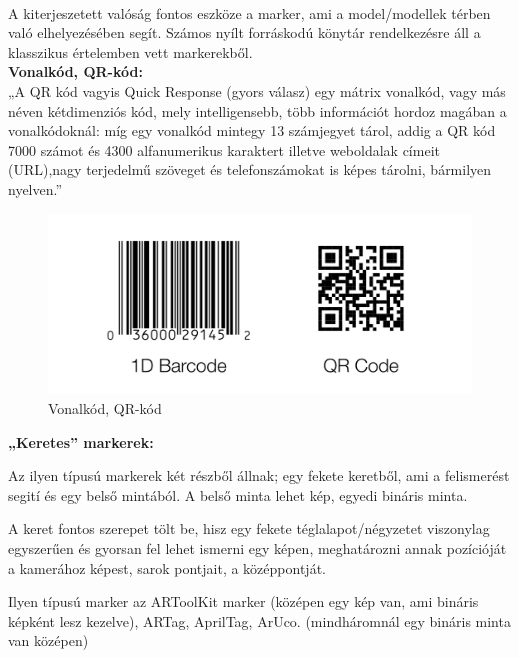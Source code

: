 

\\
A kiterjeszetett valóság fontos eszköze a marker, ami a model/modellek térben való elhelyezésében segít. Számos nyílt forráskodú könytár rendelkezésre áll a klasszikus értelemben vett markerekből.\\

{\bf Vonalkód, QR-kód:}\\
„A  QR  kód vagyis Quick  Response  (gyors  válasz) egy  mátrix  vonalkód,  vagy  más  néven kétdimenziós kód, mely intelligensebb, több információt hordoz magában a vonalkódoknál: míg egy vonalkód mintegy 13 számjegyet tárol, addig a QR kód 7000 számot és 4300 alfanumerikus karaktert illetve weboldalak címeit (URL),nagy terjedelmű szöveget és telefonszámokat is képes tárolni, bármilyen nyelven.”\\

\begin{figure}[htp]
    \centering
   	\includegraphics[width=4.8truecm, height=2truecm]{images/qr_bar.png}
	\caption{Vonalkód, QR-kód}
\end{figure}

{\bf „Keretes” markerek:}

Az ilyen típusú markerek két részből állnak; egy fekete keretből, ami a felismerést segití és egy belső mintából. A belső minta lehet kép, egyedi bináris minta.

A keret fontos szerepet tölt be, hisz egy fekete téglalapot/négyzetet viszonylag egyszerűen és gyorsan fel lehet ismerni egy képen, meghatározni annak pozícióját a kamerához képest, sarok pontjait, a középpontját.

Ilyen típusú marker az ARToolKit marker (középen egy kép van, ami bináris képként lesz kezelve), ARTag, AprilTag, ArUco. (mindháromnál egy bináris minta van középen)

